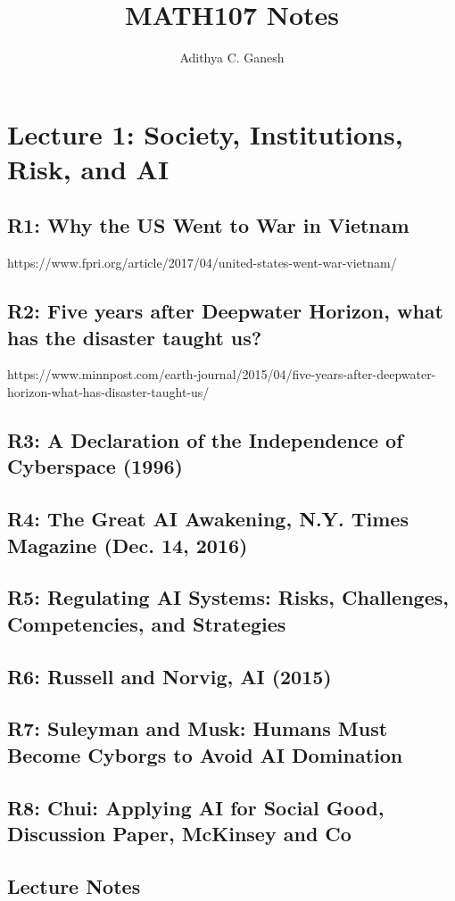 \documentclass{article}
\title{MATH107 Notes}
\author{Adithya C. Ganesh}
\begin{document}
\maketitle

\tableofcontents

\section{Lecture 1: Society, Institutions, Risk, and AI}

\subsection{R1: Why the US Went to War in Vietnam}

https://www.fpri.org/article/2017/04/united-states-went-war-vietnam/

\subsection{R2: Five years after Deepwater Horizon, what has the disaster taught us?}

https://www.minnpost.com/earth-journal/2015/04/five-years-after-deepwater-horizon-what-has-disaster-taught-us/

\subsection{R3: A Declaration of the Independence of Cyberspace (1996)}

\subsection{R4: The Great AI Awakening, N.Y. Times Magazine (Dec. 14, 2016)}

\subsection{R5: Regulating AI Systems: Risks, Challenges, Competencies, and Strategies}

\subsection{R6: Russell and Norvig, AI (2015)}

\subsection{R7: Suleyman and Musk: Humans Must Become Cyborgs to Avoid AI Domination}

\subsection{R8: Chui: Applying AI for Social Good, Discussion Paper, McKinsey and Co}

\subsection{Lecture Notes}
\end{document}
